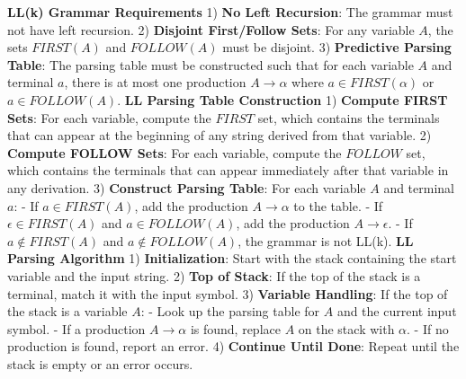 \textbf{LL(k) Grammar Requirements}
1) \textbf{No Left Recursion}: The grammar must not have left recursion.
2) \textbf{Disjoint First/Follow Sets}: For any variable $A$, the sets $FIRST(A)$ and $FOLLOW(A)$ must be disjoint.
3) \textbf{Predictive Parsing Table}: The parsing table must be constructed such that for each variable $A$ and terminal $a$, there is at most one production $A \to \alpha$ where $a \in FIRST(\alpha)$ or $a \in FOLLOW(A)$.
\textbf{LL Parsing Table Construction}
1) \textbf{Compute FIRST Sets}: For each variable, compute the $FIRST$ set, which contains the terminals that can appear at the beginning of any string derived from that variable.
2) \textbf{Compute FOLLOW Sets}: For each variable, compute the $FOLLOW$ set, which contains the terminals that can appear immediately after that variable in any derivation.
3) \textbf{Construct Parsing Table}: For each variable $A$ and terminal $a$:
   - If $a \in FIRST(A)$, add the production $A \to \alpha$ to the table.
   - If $\epsilon \in FIRST(A)$ and $a \in FOLLOW(A)$, add the production $A \to \epsilon$.
   - If $a \notin FIRST(A)$ and $a \notin FOLLOW(A)$, the grammar is not LL(k).
\textbf{LL Parsing Algorithm}
1) \textbf{Initialization}: Start with the stack containing the start variable and the input string.
2) \textbf{Top of Stack}: If the top of the stack is a terminal, match it with the input symbol.
3) \textbf{Variable Handling}: If the top of the stack is a variable $A$:
   - Look up the parsing table for $A$ and the current input symbol.
   - If a production $A \to \alpha$ is found, replace $A$ on the stack with $\alpha$.
   - If no production is found, report an error.
4) \textbf{Continue Until Done}: Repeat until the stack is empty or an error occurs.
